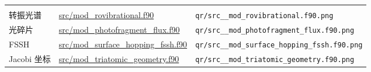 \documentclass[
]{ctexbook}
\begin{document}
\begin{longtable}[]{@{}lll@{}}
\begin{minipage}[t]{0.30\columnwidth}
\end{minipage}\tabularnewline
\begin{minipage}[t]{0.30\columnwidth}\raggedright
转振光谱\strut
\end{minipage} & \begin{minipage}[t]{0.30\columnwidth}\raggedright
\href{https://github.com/l1Ha/QuantumGeneralModule/blob/main/src/mod_rovibrational.f90}{src/mod\_rovibrational.f90}\strut
\end{minipage} & \begin{minipage}[t]{0.30\columnwidth}\raggedright
\texttt{qr/src\_\_mod\_rovibrational.f90.png}\strut
\end{minipage}\tabularnewline
\begin{minipage}[t]{0.30\columnwidth}\raggedright
光碎片\strut
\end{minipage} & \begin{minipage}[t]{0.30\columnwidth}\raggedright
\href{https://github.com/l1Ha/QuantumGeneralModule/blob/main/src/mod_photofragment_flux.f90}{src/mod\_photofragment\_flux.f90}\strut
\end{minipage} & \begin{minipage}[t]{0.30\columnwidth}\raggedright
\texttt{qr/src\_\_mod\_photofragment\_flux.f90.png}\strut
\end{minipage}\tabularnewline
\begin{minipage}[t]{0.30\columnwidth}\raggedright
FSSH\strut
\end{minipage} & \begin{minipage}[t]{0.30\columnwidth}\raggedright
\href{https://github.com/l1Ha/QuantumGeneralModule/blob/main/src/mod_surface_hopping_fssh.f90}{src/mod\_surface\_hopping\_fssh.f90}\strut
\end{minipage} & \begin{minipage}[t]{0.30\columnwidth}\raggedright
\texttt{qr/src\_\_mod\_surface\_hopping\_fssh.f90.png}\strut
\end{minipage}\tabularnewline
\begin{minipage}[t]{0.30\columnwidth}\raggedright
Jacobi 坐标\strut
\end{minipage} & \begin{minipage}[t]{0.30\columnwidth}\raggedright
\href{https://github.com/l1Ha/QuantumGeneralModule/blob/main/src/mod_triatomic_geometry.f90}{src/mod\_triatomic\_geometry.f90}\strut
\end{minipage} & \begin{minipage}[t]{0.30\columnwidth}\raggedright
\texttt{qr/src\_\_mod\_triatomic\_geometry.f90.png}\strut

\end{minipage}
\end{longtable}
\end{document}
